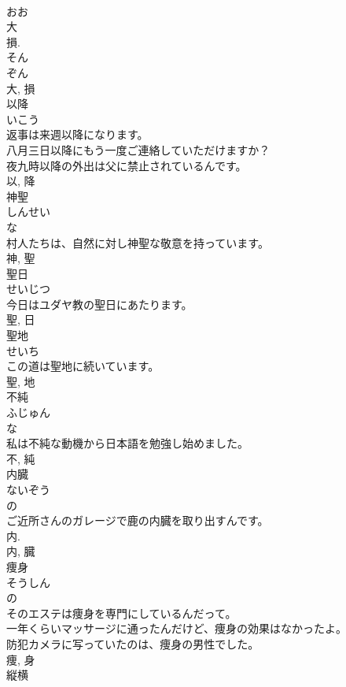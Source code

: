 \documentclass[8pt]{extreport}
\begin{document}
\begin{CJK}{UTF8}{min}
\\	おお 
\\	大 
\\	損. 
\\	そん 
\\	ぞん 
\\	大, 損	
\\	以降	
\\	いこう	
\\	返事は来週以降になります。	
\\	八月三日以降にもう一度ご連絡していただけますか？	
\\	夜九時以降の外出は父に禁止されているんです。	
\\	以, 降	
\\	神聖	
\\	しんせい	
\\	な 
\\	村人たちは、自然に対し神聖な敬意を持っています。	
\\	神, 聖	
\\	聖日	
\\	せいじつ	
\\	今日はユダヤ教の聖日にあたります。	
\\	聖, 日	
\\	聖地	
\\	せいち	
\\	この道は聖地に続いています。	
\\	聖, 地	
\\	不純	
\\	ふじゅん	
\\	な 
\\	私は不純な動機から日本語を勉強し始めました。	
\\	不, 純	
\\	内臓	
\\	ないぞう	
\\	の 
\\	ご近所さんのガレージで鹿の内臓を取り出すんです。	
\\	内.	
\\	内, 臓	
\\	痩身	
\\	そうしん	
\\	の 
\\	そのエステは痩身を専門にしているんだって。	
\\	一年くらいマッサージに通ったんだけど、痩身の効果はなかったよ。	
\\	防犯カメラに写っていたのは、痩身の男性でした。	
\\	痩, 身	
\\	縦横	

\end{CJK}
\end{document}
